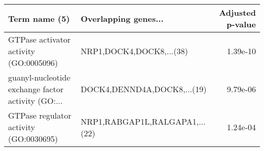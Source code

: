 \begin{tabular}{llr}
\toprule
                                     Term name (5) &           Overlapping genes... &  Adjusted p-value \\
\midrule
            GTPase activator activity (GO:0005096) &       NRP1,DOCK4,DOCK8,...(38) &          1.39e-10 \\
guanyl-nucleotide exchange factor activity (GO:... &    DOCK4,DENND4A,DOCK8,...(19) &          9.79e-06 \\
            GTPase regulator activity (GO:0030695) & NRP1,RABGAP1L,RALGAPA1,...(22) &          1.24e-04 \\
\bottomrule
\end{tabular}

